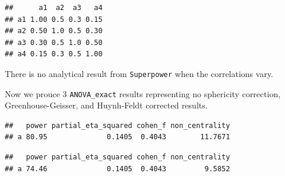 \documentclass[]{book}
\newenvironment{Shaded}{\begin{snugshade}}{\end{snugshade}}
\newcommand{\DataTypeTok}[1]{\textcolor[rgb]{0.13,0.29,0.53}{#1}}
\newcommand{\KeywordTok}[1]{\textcolor[rgb]{0.13,0.29,0.53}{\textbf{#1}}}
\newcommand{\NormalTok}[1]{#1}
\newcommand{\OperatorTok}[1]{\textcolor[rgb]{0.81,0.36,0.00}{\textbf{#1}}}
\newcommand{\OtherTok}[1]{\textcolor[rgb]{0.56,0.35,0.01}{#1}}
\newcommand{\StringTok}[1]{\textcolor[rgb]{0.31,0.60,0.02}{#1}}
\begin{document}
\begin{verbatim}
##      a1  a2  a3   a4
## a1 1.00 0.5 0.3 0.15
## a2 0.50 1.0 0.5 0.30
## a3 0.30 0.5 1.0 0.50
## a4 0.15 0.3 0.5 1.00
\end{verbatim}

There is no analytical result from \texttt{Superpower} when the correlations vary.

Now we prouce 3 \texttt{ANOVA\_exact} results representing no sphericity correction, Greenhouse-Geisser, and Huynh-Feldt corrected results.

\begin{Shaded}
\end{Shaded}

\begin{verbatim}
##   power partial_eta_squared cohen_f non_centrality
## a 80.95              0.1405  0.4043        11.7671
\end{verbatim}

\begin{Shaded}
\end{Shaded}

\begin{verbatim}
##   power partial_eta_squared cohen_f non_centrality
## a 74.46              0.1405  0.4043         9.5852
\end{verbatim}

\begin{Shaded}
\end{Shaded}
\end{document}
